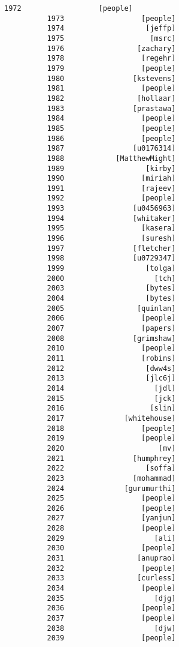 \documentclass[11pt]{article}
\begin{document}
\begin{Verbatim}[commandchars=\\\{\}]
          1972                  [people]
          1973                  [people]
          1974                   [jeffp]
          1975                    [msrc]
          1976                 [zachary]
          1978                  [regehr]
          1979                  [people]
          1980                [kstevens]
          1981                  [people]
          1982                 [hollaar]
          1983                [prastawa]
          1984                  [people]
          1985                  [people]
          1986                  [people]
          1987                [u0176314]
          1988            [MatthewMight]
          1989                   [kirby]
          1990                  [miriah]
          1991                  [rajeev]
          1992                  [people]
          1993                [u0456963]
          1994                [whitaker]
          1995                  [kasera]
          1996                  [suresh]
          1997                [fletcher]
          1998                [u0729347]
          1999                   [tolga]
          2000                     [tch]
          2003                   [bytes]
          2004                   [bytes]
          2005                 [quinlan]
          2006                  [people]
          2007                  [papers]
          2008                [grimshaw]
          2010                  [people]
          2011                  [robins]
          2012                   [dww4s]
          2013                   [jlc6j]
          2014                     [jdl]
          2015                     [jck]
          2016                    [slin]
          2017              [whitehouse]
          2018                  [people]
          2019                  [people]
          2020                      [mv]
          2021                [humphrey]
          2022                   [soffa]
          2023                [mohammad]
          2024              [gurumurthi]
          2025                  [people]
          2026                  [people]
          2027                  [yanjun]
          2028                  [people]
          2029                     [ali]
          2030                  [people]
          2031                 [anuprao]
          2032                  [people]
          2033                 [curless]
          2034                  [people]
          2035                     [djg]
          2036                  [people]
          2037                  [people]
          2038                     [djw]
          2039                  [people]

\end{Verbatim}
\end{document}

